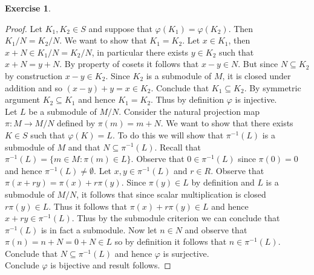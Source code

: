 \documentclass[8pt]{amsart}
\theoremstyle{plain}%
\theoremstyle{definition}
\newtheorem{exercise}{Exercise}[section]
\theoremstyle{remark}
\numberwithin{equation}{section}
\begin{document}
\begin{exercise}
\begin{enumerate}
\begin{proof}
				Let $K_1, K_2 \in S$ and suppose that $\varphi(K_1) = \varphi(K_2)$. Then $K_1/N = K_2/N$. We want to show that $K_1 = K_2$. Let $x \in K_1$, then $x + N \in K_1/N = K_2/N$, in particular there exists $y \in K_2$ such that $x + N = y + N$. By property of cosets it follows that $x - y \in N$. But since $N \subseteq K_2$ by construction $x - y \in K_2$. Since $K_2$ is a submodule of $M$, it is closed under addition and so $(x - y) + y = x \in K_2$. Conclude that $K_1 \subseteq K_2$. By symmetric argument $K_2 \subseteq K_1$ and hence $K_1 = K_2$. Thus by definition $\varphi$ is injective.\\

				Let $L$ be a submodule of $M/N$. Consider the natural projection map $\pi : M \to M/N$ defined by $\pi(m) = m + N$. We want to show that there exists $K \in S$ such that $\varphi(K) = L$. To do this we will show that $\pi^{-1}(L)$ is a submodule of $M$ and that $N \subseteq \pi^{-1}(L)$. Recall that $\pi^{-1}(L) = \{m \in M : \pi(m) \in L\}$. Observe that $0 \in \pi^{-1}(L)$ since $\pi(0) = 0$ and hence $\pi^{-1}(L) \neq \emptyset$. Let $x, y \in \pi^{-1}(L)$ and $r \in R$. Observe that $\pi(x + ry) = \pi(x) + r \pi(y)$. Since $\pi(y) \in L$ by definition and $L$ is a submodule of $M/N$, it follows that since scalar multiplication is closed $r\pi(y) \in L$. Thus it follows that $\pi(x) + r \pi(y) \in L$ and hence $x + ry \in \pi^{-1}(L)$. Thus by the submodule criterion we can conclude that $\pi^{-1}(L)$ is in fact a submodule. Now let $n \in N$ and observe that $\pi(n) = n + N = 0 + N \in L$ so by definition it follows that $n \in \pi^{-1}(L)$. Conclude that $N \subseteq \pi^{-1}(L)$ and hence $\varphi$ is surjective.\\

				Conclude $\varphi$ is bijective and result follows.
			\end{proof}
	\end{enumerate}
\end{exercise}
\end{document}
